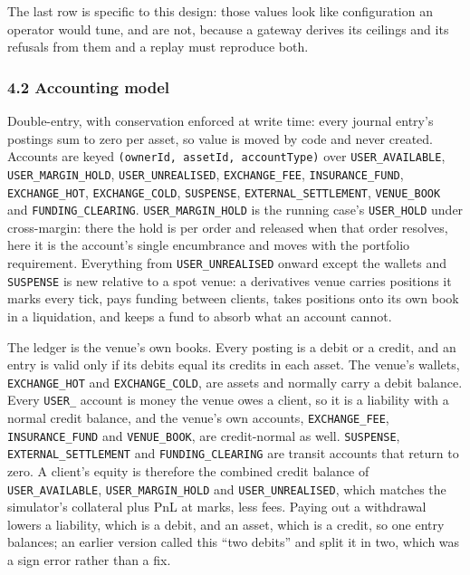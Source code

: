 \documentclass[10pt,a4paper]{article}
\begin{document}
The last row is specific to this design: those values look like configuration an
operator would tune, and are not, because a gateway derives its ceilings and its
refusals from them and a replay must reproduce both.

\subsubsection{4.2 Accounting model}\label{accounting-model}

Double-entry, with conservation enforced at write time: every journal entry's
postings sum to zero per asset, so value is moved by code and never created.
Accounts are keyed \texttt{(ownerId,\ assetId,\ accountType)} over \texttt{USER\_AVAILABLE},
\texttt{USER\_MARGIN\_HOLD}, \texttt{USER\_UNREALISED}, \texttt{EXCHANGE\_FEE}, \texttt{INSURANCE\_FUND},
\texttt{EXCHANGE\_HOT}, \texttt{EXCHANGE\_COLD}, \texttt{SUSPENSE}, \texttt{EXTERNAL\_SETTLEMENT}, \texttt{VENUE\_BOOK} and
\texttt{FUNDING\_CLEARING}.
\texttt{USER\_MARGIN\_HOLD} is the running case's \texttt{USER\_HOLD} under cross-margin: there
the hold is per order and released when that order resolves, here it is the
account's single encumbrance and moves with the portfolio requirement.
Everything from \texttt{USER\_UNREALISED} onward except the wallets and \texttt{SUSPENSE} is new
relative to a spot venue: a derivatives venue carries positions it marks every
tick, pays funding between clients, takes positions onto its own book in a
liquidation, and keeps a fund to absorb what an account cannot.

The ledger is the venue's own books. Every posting is a debit or a credit, and an
entry is valid only if its debits equal its credits in each asset. The venue's
wallets, \texttt{EXCHANGE\_HOT} and \texttt{EXCHANGE\_COLD}, are assets and normally carry a
debit balance. Every \texttt{USER\_} account is money the venue owes a client, so it is
a liability with a normal credit balance, and the venue's own accounts,
\texttt{EXCHANGE\_FEE}, \texttt{INSURANCE\_FUND} and \texttt{VENUE\_BOOK}, are credit-normal as well.
\texttt{SUSPENSE}, \texttt{EXTERNAL\_SETTLEMENT} and \texttt{FUNDING\_CLEARING} are transit accounts that
return to zero. A client's equity is therefore the combined credit balance of
\texttt{USER\_AVAILABLE}, \texttt{USER\_MARGIN\_HOLD} and \texttt{USER\_UNREALISED}, which matches the
simulator's collateral plus PnL at marks, less fees. Paying out a withdrawal
lowers a liability, which is a debit, and an asset, which is a credit, so one
entry balances; an earlier version called this ``two debits'' and split it in two,
which was a sign error rather than a fix.
\end{document}
